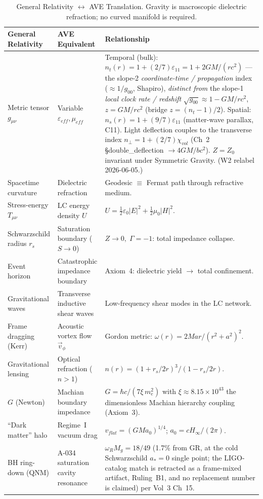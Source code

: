 %

\begin{table}[H]
\centering
\caption{General Relativity $\leftrightarrow$ AVE Translation.  Gravity is macroscopic dielectric refraction; no curved manifold is required.}
\label{tab:trans_gravity}
\small
\renewcommand{\arraystretch}{1.3}
\begin{tabular}{@{}p{3.8cm} p{4.0cm} p{5.8cm}@{}}
\toprule
\textbf{General Relativity} & \textbf{AVE Equivalent} & \textbf{Relationship} \\
\midrule
Metric tensor $g_{\mu\nu}$ & Variable $\varepsilon_{eff}, \mu_{eff}$ & Temporal (bulk): $n_t(r) = 1 + (2/7)\varepsilon_{11} = 1 + 2GM/(rc^2)$ --- the slope-2 \emph{coordinate-time / propagation} index ($\approx 1/g_{00}$, Shapiro), \emph{distinct from} the slope-1 \emph{local clock rate / redshift} $\sqrt{g_{00}} \approx 1 - GM/rc^2$, $z = GM/rc^2$ (bridge $z = (n_t - 1)/2$). Spatial: $n_s(r) = 1 + (9/7)\varepsilon_{11}$ (matter-wave parallax, C11). Light deflection couples to the transverse index $n_\perp = 1 + (2/7)\chi_{vol}$ (Ch~2 §double\_deflection $\to 4GM/bc^2$). $Z = Z_0$ invariant under Symmetric Gravity. (W2 relabel 2026-06-05.) \\
Spacetime curvature & Dielectric refraction & Geodesic $\equiv$ Fermat path through refractive medium. \\
Stress-energy $T_{\mu\nu}$ & LC energy density $U$ & $U = \tfrac{1}{2}\varepsilon_0 |E|^2 + \tfrac{1}{2}\mu_0 |H|^2$. \\
Schwarzschild radius $r_s$ & Saturation boundary ($S \to 0$) & $Z \to 0, \; \Gamma = -1$\gammaundeclared{}: total impedance collapse. \\
Event horizon & Catastrophic impedance boundary & Axiom~4: dielectric yield $\to$ total confinement. \\
Gravitational waves & Transverse inductive shear waves & Low-frequency shear modes in the LC network. \\
Frame dragging (Kerr) & Acoustic vortex flow $\vec{v}_\phi$ & Gordon metric: $\omega(r) = 2Mar/(r^2+a^2)^2$. \\
Gravitational lensing & Optical refraction ($n > 1$) & $n(r) = (1+r_s/2r)^3/(1-r_s/2r)$. \\
$G$ (Newton) & Machian boundary impedance & $G = \hbar c/(7\xi\,m_e^2)$ with $\xi \approx 8.15\times 10^{43}$ the dimensionless Machian hierarchy coupling (Axiom~3). \\
``Dark matter'' halo & Regime~I vacuum drag & $v_{flat} = (GM a_0)^{1/4}$; $a_0 = cH_\infty/(2\pi)$. \\
BH ring-down (QNM) & A-034 saturation cavity resonance & $\omega_R M_g = 18/49$ (1.7\% from GR, at the cold Schwarzschild $a_*=0$ single point; the LIGO-catalog match is retracted as a frame-mixed artifact, Ruling~B1, and no replacement number is claimed) per Vol~3 Ch~15. \\
\bottomrule
\end{tabular}
\end{table}
